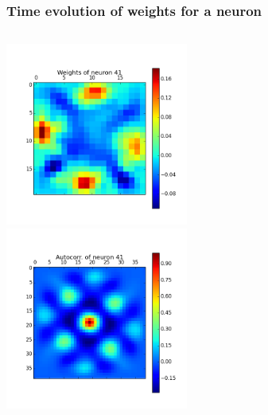 \begin{frame}
\frametitle{Time evolution of weights for a neuron}
\begin{columns}[t]
\centering
\includegraphics[width=6cm,height=6cm]{neurons/neuron_w_41.png}\\
\centering
\includegraphics[width=6cm,height=6cm]{neurons/neuron_a_41.png}\\
\end{columns}
\end{frame}